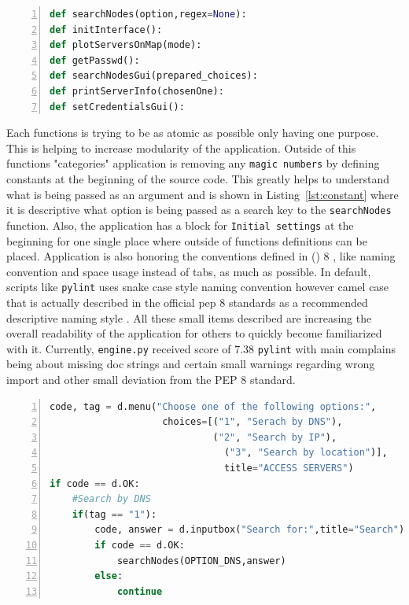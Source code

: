 {{{\noindent\begin{minipage}{\linewidth}
\begin{lstlisting}[language=Python, numbers=left, label={lst:descriptive}, caption=Example of Function Names, frame=single, showstringspaces=false, breaklines=true, keywordstyle=\color{blue},captionpos=b]
def searchNodes(option,regex=None):
def initInterface():
def plotServersOnMap(mode):
def getPasswd():
def searchNodesGui(prepared_choices):
def printServerInfo(chosenOne):
def setCredentialsGui():
\end{lstlisting}
\end{minipage}

Each functions is trying to be as atomic as possible only having one purpose. This is helping to increase modularity of the application. Outside of this functions "categories" application is removing any \texttt{magic numbers} by defining constants at the beginning of the source code. This greatly helps to understand what is being passed as an argument and is shown in Listing~\ref{lst:constant} where it is descriptive what option is being passed as a search key to the \texttt{searchNodes} function. Also, the application has a block for \texttt{Initial settings} at the beginning for one single place where outside of functions definitions can be placed. Application is also honoring the conventions defined in  () 8 \cite{pythonpep}, like naming convention and space usage instead of tabs, as much as possible. In default, scripts like \texttt{pylint} uses snake case style naming convention however camel case that is actually described in the official pep 8 standards as a recommended descriptive naming style \cite{pythonpep}. All these small items described are increasing the overall readability of the application for others to quickly become familiarized with it. Currently, \texttt{engine.py} received score of 7.38  \texttt{pylint} with main complains being about missing doc strings and certain small warnings regarding wrong import and other small deviation from the PEP 8 standard.

{\noindent\begin{minipage}{\linewidth}
\begin{lstlisting}[language=Python, numbers=left, label={lst:constant}, caption=Example of Constant Usage, frame=single, showstringspaces=false, breaklines=true, keywordstyle=\color{blue},captionpos=b]
code, tag = d.menu("Choose one of the following options:",
					choices=[("1", "Serach by DNS"),
				      		 ("2", "Search by IP"),
					    	   ("3", "Search by location")],
						       title="ACCESS SERVERS")
if code == d.OK:
	#Search by DNS
	if(tag == "1"):
		code, answer = d.inputbox("Search for:",title="Search")
		if code == d.OK:
			searchNodes(OPTION_DNS,answer)
		else:
			continue
\end{lstlisting}
\end{minipage}

}}}}
